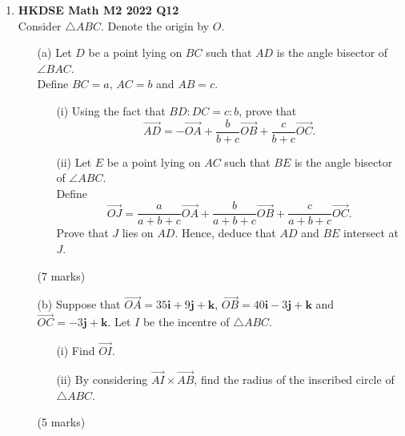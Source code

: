 \documentclass{report}
\begin{document}
\begin{enumerate}
	\item \textbf{HKDSE Math M2 2022 Q12}\\
	Consider $\triangle ABC$. Denote the origin by $O$. 
	\begin{enumerate}
		\item [(a)]Let $D$ be a point lying on $BC$ such that $AD$ is the angle bisector of $\angle BAC$. \\
		Define $BC = a$, $AC = b$  and  $AB = c$. 
		\begin{enumerate}
			\item [(i)]Using the fact that $BD:DC = c:b$, prove that $$\overrightarrow{AD} = -\overrightarrow{OA}+\displaystyle\frac{b}{b+c}\overrightarrow{OB} + \displaystyle\frac{c}{b+c}\overrightarrow{OC}.$$
			\item [(ii)]Let $E$ be a point lying on $AC$ such that $BE$ is the angle bisector of $\angle ABC$. \\
			Define $$\overrightarrow{OJ} = \displaystyle\frac{a}{a+b+c}\overrightarrow{OA}+\displaystyle\frac{b}{a+b+c}\overrightarrow{OB}+\displaystyle\frac{c}{a+b+c}\overrightarrow{OC}.$$
				Prove that $J$ lies on $AD$. Hence, deduce that $AD$ and $BE$ intersect at $J$.
		\end{enumerate}
		(7 marks)
		\item [(b)]Suppose that $\overrightarrow{OA} = 35\textbf{i} +9 \textbf{j}+ \textbf {k}$, $\overrightarrow{OB} = 40\textbf{i} -3 \textbf{j}+ \textbf {k}$ and $\overrightarrow{OC} =  -3 \textbf{j}+ \textbf {k}$. Let $I$ be the incentre of $\triangle ABC$. 
		\begin{enumerate}
			\item [(i)] Find $\overrightarrow{OI}$. 
			\item [(ii)] By considering $\overrightarrow{AI} \times \overrightarrow{AB}$, find the radius of the inscribed circle of $\triangle ABC$. 
		\end{enumerate}
		(5 marks)
	\end{enumerate}

\end{enumerate}
\end{document}
